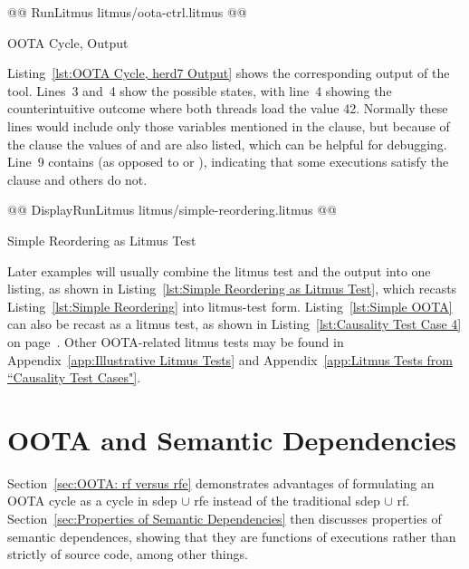 \documentclass[10]{article}
\begin{document}
\begin{listing}[tbp]
@@ RunLitmus litmus/oota-ctrl.litmus @@
\caption{OOTA Cycle,  Output}
\label{lst:OOTA Cycle, herd7 Output}
\end{listing}

Listing~\ref{lst:OOTA Cycle, herd7 Output} shows the corresponding output
of the  tool.
Lines~3 and~4 show the possible states, with line~4 showing the
counterintuitive outcome where both threads load the value 42.
Normally these lines would include only those variables mentioned
in the  clause, but because of the  clause
the values of  and  are also listed, which
can be helpful for debugging.
Line~9 contains  (as opposed to  or ),
indicating that some executions satisfy the  clause and
others do not.

\begin{listing}[tbp]
@@ DisplayRunLitmus litmus/simple-reordering.litmus @@
\caption{Simple Reordering as Litmus Test}
\label{lst:Simple Reordering as Litmus Test}
\end{listing}

Later examples will usually combine the litmus test and the 
output into one listing, as shown in
Listing~\ref{lst:Simple Reordering as Litmus Test},
which recasts
Listing~\ref{lst:Simple Reordering}
into litmus-test form.
Listing~\ref{lst:Simple OOTA}
can also be recast as a  litmus test, as shown in
Listing~\ref{lst:Causality Test Case 4}
on page~\pageref{lst:Causality Test Case 4}.
Other OOTA-related litmus tests may be found in
Appendix~\ref{app:Illustrative Litmus Tests}
and
Appendix~\ref{app:Litmus Tests from “Causality Test Cases"}.

\section{OOTA and Semantic Dependencies}
\label{sec:OOTA and Semantic Dependencies}

Section~\ref{sec:OOTA: rf versus rfe}
demonstrates advantages of formulating an OOTA cycle as a cycle in
sdep $\cup$ rfe instead of the traditional sdep $\cup$ rf.
Section~\ref{sec:Properties of Semantic Dependencies}
then discusses properties of semantic dependences, showing that they
are functions of executions rather than strictly of source code,
among other things.
\end{document}
